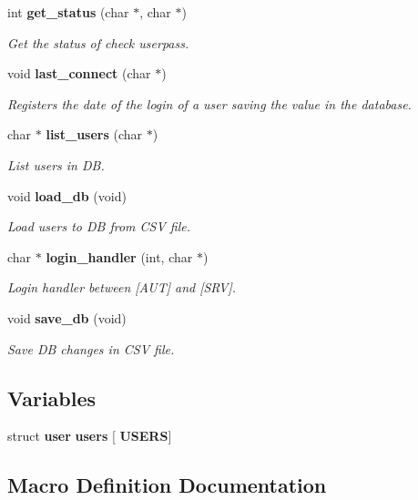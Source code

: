 \begin{DoxyCompactItemize}
int \textbf{ get\+\_\+status} (char $\ast$, char $\ast$)
\begin{DoxyCompactList}\small\item\em Get the status of check userpass. \end{DoxyCompactList}\item 
void \textbf{ last\+\_\+connect} (char $\ast$)
\begin{DoxyCompactList}\small\item\em Registers the date of the login of a user saving the value in the database. \end{DoxyCompactList}\item 
char $\ast$ \textbf{ list\+\_\+users} (char $\ast$)
\begin{DoxyCompactList}\small\item\em List users in DB. \end{DoxyCompactList}\item 
void \textbf{ load\+\_\+db} (void)
\begin{DoxyCompactList}\small\item\em Load users to DB from C\+SV file. \end{DoxyCompactList}\item 
char $\ast$ \textbf{ login\+\_\+handler} (int, char $\ast$)
\begin{DoxyCompactList}\small\item\em Login handler between [A\+UT] and [S\+RV]. \end{DoxyCompactList}\item 
void \textbf{ save\+\_\+db} (void)
\begin{DoxyCompactList}\small\item\em Save DB changes in C\+SV file. \end{DoxyCompactList}\end{DoxyCompactItemize}
\subsection*{Variables}
\begin{DoxyCompactItemize}
\item 
struct \textbf{ user} \textbf{ users} [\textbf{ U\+S\+E\+RS}]
\end{DoxyCompactItemize}


\subsection{Macro Definition Documentation}
\mbox{\label{auth_8h_a618d6577d85428a5a48d41a23c107555}} 
